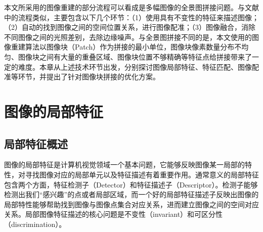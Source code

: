 

本文所采用的图像重建的部分流程可以看成是多幅图像的全景图拼接问题。与文献\cite{Brown:2006ir}中的流程类似，主要包含以下几个环节：（1）使用具有不变性的特征来描述图像；（2）自动的找到图像之间的空间位置关系，进行图像配准；（3）图像融合，消除不同图像之间的光照差别，去除边缘噪声。与全景图拼接不同的是，本文使用的图像重建算法以图像块（Patch）作为拼接的最小单位，图像块像素数量分布不均匀、图像块之间有大量的重叠区域、图像块位置不够精确等特征点给拼接带来了一定的难度。本章从上述技术环节出发，分别探讨图像局部特征、特征匹配、图像配准等环节，并提出了针对图像块拼接的优化方案。

\section{图像的局部特征}

\subsection{局部特征概述}
图像的局部特征是计算机视觉领域一个基本问题，它能够反映图像某一局部的特性，对寻找图像对应的局部单元以及特征描述有着重要作用。通常意义的局部特征包含两个方面，特征检测子（Detector）和特征描述子（Descriptor）。检测子能够检测出我们“感兴趣”的点或者局部区域，而一个好的局部特征描述子反映出图像的局部特性能够帮助找到图像与图像点集合对应关系，进而建立图像之间的空间对应关系。局部图像特征描述的核心问题是不变性（invariant）和可区分性（discrimination）。

